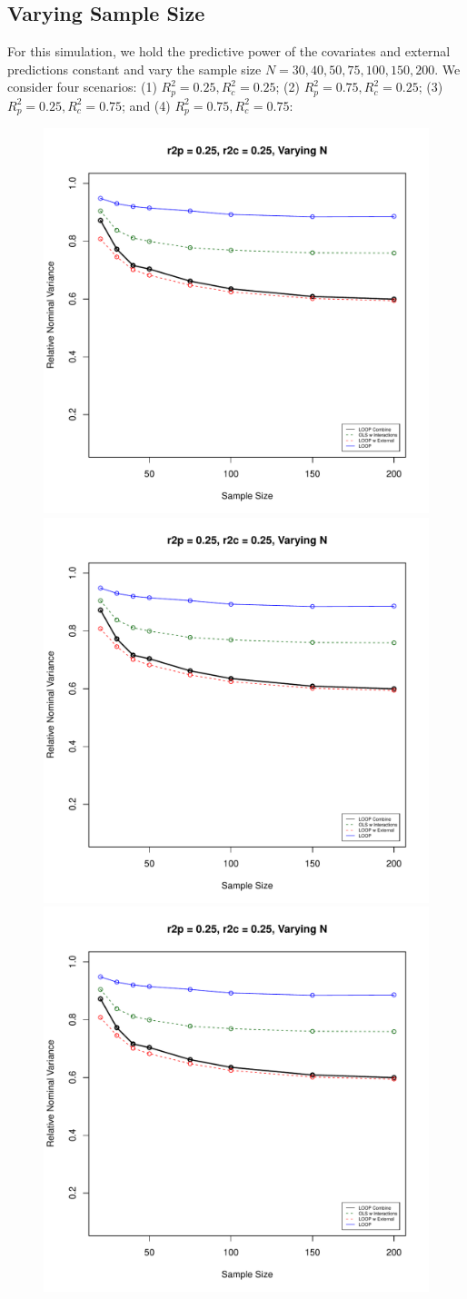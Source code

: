 \subsection{Varying Sample Size}
For this simulation, we hold the predictive power of the covariates and external predictions constant and vary the sample size $N = 30, 40, 50, 75, 100, 150, 200$. We consider four scenarios: (1) $R^2_p = 0.25, R^2_c = 0.25$; (2) $R^2_p = 0.75, R^2_c = 0.25$; (3) $R^2_p = 0.25, R^2_c = 0.75$; and (4) $R^2_p = 0.75, R^2_c = 0.75$:
\begin{figure}[H]
	\centering
	\includegraphics[width=.49\linewidth]{images/sampsize.pdf} 
	\includegraphics[width=.49\linewidth,page = 2]{images/sampsize.pdf} \quad
	\smallskip
	\includegraphics[width=.49\linewidth,page = 3]{images/sampsize.pdf} 

\end{figure}

